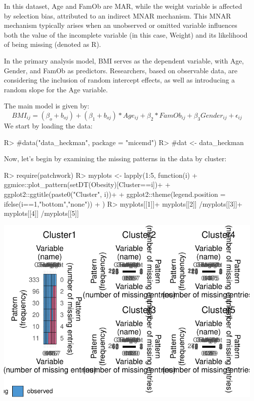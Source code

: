 \documentclass[
]{jss}
\begin{document}
In this dataset, Age and FamOb are MAR, while the weight variable is
affected by selection bias, attributed to an indirect MNAR mechanism.
This MNAR mechanism typically arises when an unobserved or omitted
variable influences both the value of the incomplete variable (in this
case, Weight) and its likelihood of being missing (denoted as R).

In the primary analysis model, BMI serves as the dependent variable,
with Age, Gender, and FamOb as predictors. Researchers, based on
observable data, are considering the inclusion of random intercept
effects, as well as introducing a random slope for the Age variable.

The main model is given by:
\[BMI_{ij}= (\beta_{o}+ b_{oj} ) + (\beta_{1}+ b_{oj})* Age_{ij} + \beta_{2}*FamOb_{ij}+ \beta_{3}Gender_{ij} + \epsilon_{ij}\]
We start by loading the data:

\begin{CodeChunk}
\begin{CodeInput}
R> #data("data_heckman", package = "micemd")
R> #dat <- data_heckman
\end{CodeInput}
\end{CodeChunk}

Now, let's begin by examining the missing patterns in the data by
cluster:

\begin{CodeChunk}
\begin{CodeInput}
R> require(patchwork)
R>   myplots <- lapply(1:5, function(i) {
+          ggmice::plot_pattern(setDT(Obesity)[Cluster==i])+ 
+          ggplot2::ggtitle(paste0("Cluster", i))+ 
+          ggplot2::theme(legend.position = ifelse(i==1,"bottom","none"))
+       })
R>   myplots[[1]]+ myplots[[2]] /myplots[[3]]+ myplots[[4]] /myplots[[5]]
\end{CodeInput}


\begin{center}\includegraphics{Imputation_of_Incomplete_Multilevel_Data_files/figure-latex/obesity-md-1} \end{center}

\end{CodeChunk}
\end{document}
